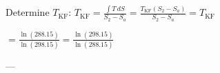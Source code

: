 Determine \( T_{\text{KF}} \):  
\( T_{\text{KF}} = \frac{\int T \, dS}{S_2 - S_a} = \frac{T_{\text{KF}} (S_2 - S_a)}{S_2 - S_a} = T_{\text{KF}} \)  

\( = \frac{\ln (288.15)}{\ln (298.15)} = \frac{\ln (298.15)}{\ln (288.15)} \)  

---